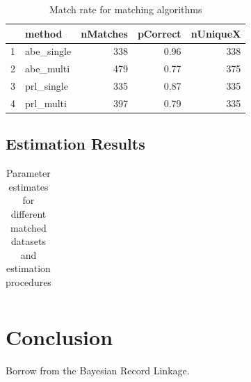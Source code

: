 \documentclass[12pt]{article}
\begin{document}
\begin{table}[ht]
\centering
\caption{Match rate for matching algorithms}
\vspace{5pt}
\begin{tabular}{rlrrr}
  \hline
 & method & nMatches & pCorrect & nUniqueX \\ 
  \hline
1 & abe\_single & 338 & 0.96 & 338 \\ 
  2 & abe\_multi & 479 & 0.77 & 375 \\ 
  3 & prl\_single & 335 & 0.87 & 335 \\ 
  4 & prl\_multi & 397 & 0.79 & 335 \\ 
   \hline
\end{tabular}
\end{table}

\subsection{Estimation Results}
\begin{table}[htdp]
\caption{Parameter estimates for different matched datasets and estimation procedures}
\begin{center}
\begin{tabular}{|c|c|}

\end{tabular}
\end{center}
\label{default}
\end{table}%


\section{Conclusion}
Borrow from the Bayesian Record Linkage. 


\newpage
\singlespacing
 

\end{document}
